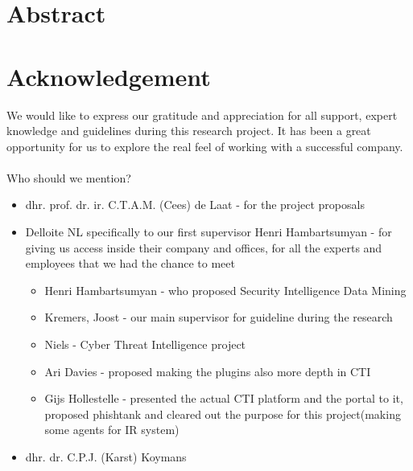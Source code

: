 \documentclass[12pt]{article}
\begin{document}
\newpage
\section*{Abstract}
\newpage
\section*{Acknowledgement}

We would like to express our gratitude and appreciation for all support, expert knowledge and guidelines during this research project. It has been a great opportunity for us to explore the real feel of working with a successful company. 
\\
\\
Who should we mention? 
\begin{itemize}
\item{dhr. prof. dr. ir. C.T.A.M. (Cees) de Laat - for the project proposals}
\item{Delloite NL specifically to our first supervisor Henri Hambartsumyan - for giving us access inside their company and offices, for all the experts and employees that we had the chance to meet}
 \begin{itemize}
 \item{Henri Hambartsumyan - who proposed Security Intelligence Data Mining}
 \item{Kremers, Joost  - our main supervisor for guideline during the research }
 \item{Niels - Cyber Threat Intelligence project}
 \item{Ari Davies - proposed making the plugins also more depth in CTI }
 \item{Gijs Hollestelle - presented the actual CTI platform and the portal to it, proposed phishtank and cleared out the purpose for this project(making some agents for IR system) }
 \end{itemize}
\item{dhr. dr. C.P.J. (Karst) Koymans}
\end{itemize}
\newpage

\tableofcontents
\newpage
\end{document}
